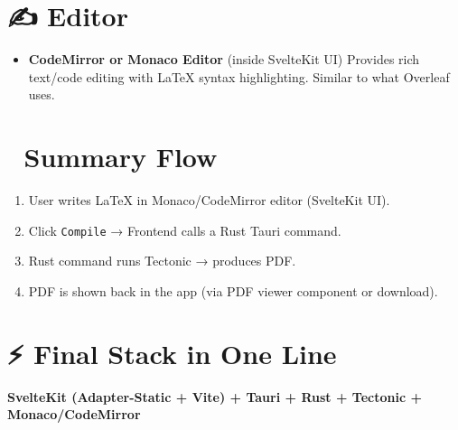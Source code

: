\documentclass[12pt,a4paper]{article}
\begin{document}
\section*{✍️ Editor}
\begin{itemize}
    \item \textbf{CodeMirror or Monaco Editor} (inside SvelteKit UI)  
    Provides rich text/code editing with LaTeX syntax highlighting.  
    Similar to what Overleaf uses.
\end{itemize}

\section*{🧩 Summary Flow}
\begin{enumerate}
    \item User writes LaTeX in Monaco/CodeMirror editor (SvelteKit UI).
    \item Click \texttt{Compile} → Frontend calls a Rust Tauri command.
    \item Rust command runs Tectonic → produces PDF.
    \item PDF is shown back in the app (via PDF viewer component or download).
\end{enumerate}

\section*{⚡ Final Stack in One Line}
\textbf{SvelteKit (Adapter-Static + Vite) + Tauri + Rust + Tectonic + Monaco/CodeMirror}
\end{document}
